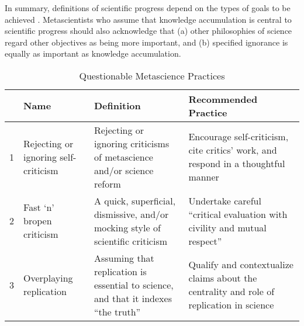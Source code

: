 \documentclass[authordate, meta]{jote-new-article}
\begin{document}
In summary, definitions of scientific progress depend on the types of goals to be achieved \parencites[p. 236]{Haig2022}. Metascientists who assume that knowledge accumulation is central to scientific progress should also acknowledge that (a) other philosophies of science regard other objectives as being more important, and (b) specified ignorance is equally as important as knowledge accumulation.



\begin{table*}
  \begin{fullwidth}
    \caption{Questionable Metascience Practices}
    \label{tab:Table1}
    \begin{tabularx}{\linewidth}{@{} l >{\RaggedRight\arraybackslash}p{12em} >{\RaggedRight\arraybackslash}X >{\RaggedRight\arraybackslash}X@{}}
      \toprule
         & Name                                                                                                                                                                                                                                    & Definition                                                                                                                                                                                           & Recommended Practice \\

      \midrule
      1  & Rejecting or ignoring self-criticism                                                                                                                                                                                                    & Rejecting or ignoring criticisms of metascience and/or science reform
         & Encourage self-criticism, cite critics’ work, and respond in a thoughtful manner
      \\

      2  & Fast ‘n’ bropen criticism                                                                                                                                                                                                               & A quick, superficial, dismissive, and/or mocking style of scientific criticism
         & Undertake careful “critical evaluation with civility and mutual respect” \parencite{bib118}
      \\

      3  & Overplaying replication                                                                                                                                                                                                                 & Assuming that replication is essential to science, and that it indexes “the truth”
         & Qualify and contextualize claims about the centrality and role of replication in science
      \\


\end{tabularx}
\end{fullwidth}
\end{table*}
\end{document}
